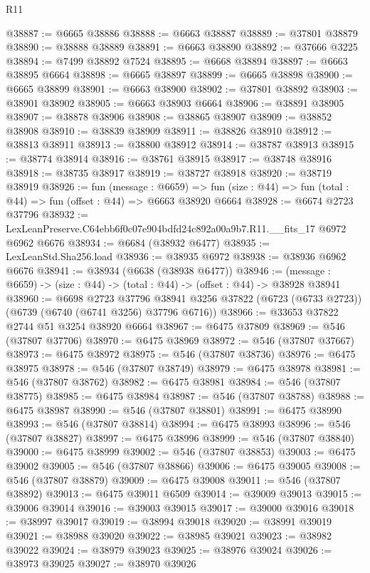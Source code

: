\begin{lexlean}{R11}
\begin{coremodule}
@38887 := @6665 @38886
@38888 := @6663 @38887
@38889 := @37801 @38879
@38890 := @38888 @38889
@38891 := @6663 @38890
@38892 := @37666 @3225
@38894 := @7499 @38892 @7524
@38895 := @6668 @38894
@38897 := @6663 @38895 @6664
@38898 := @6665 @38897
@38899 := @6665 @38898
@38900 := @6665 @38899
@38901 := @6663 @38900
@38902 := @37801 @38892
@38903 := @38901 @38902
@38905 := @6663 @38903 @6664
@38906 := @38891 @38905
@38907 := @38878 @38906
@38908 := @38865 @38907
@38909 := @38852 @38908
@38910 := @38839 @38909
@38911 := @38826 @38910
@38912 := @38813 @38911
@38913 := @38800 @38912
@38914 := @38787 @38913
@38915 := @38774 @38914
@38916 := @38761 @38915
@38917 := @38748 @38916
@38918 := @38735 @38917
@38919 := @38727 @38918
@38920 := @38719 @38919
@38926 := fun (message : @6659) =>
  fun (size : @44) => fun (total : @44) => fun (offset : @44) => @6663 @38920 @6664
@38928 := @6674 @2723 @37796
@38932 := LexLeanPreserve.C64ebb6f0c07e904bdfd24c892a00a9b7.R11.__fits_17 @6972 @6962 @6676
@38934 := @6684 (@38932 @6477)
@38935 := LexLeanStd.Sha256.load
@38936 := @38935 @6972
@38938 := @38936 @6962 @6676
@38941 := @38934 (@6638 (@38938 @6477))
@38946 := (message : @6659) -> (size : @44) -> (total : @44) -> (offset : @44) -> @38928 @38941
@38960 := @6698
    @2723
    @37796
    @38941
    @3256
    @37822
    (@6723 (@6733 @2723))
    (@6739 (@6740 (@6741 @3256) @37796 @6716))
@38966 := @33653 @37822 @2744 @51 @3254 @38920 @6664
@38967 := @6475 @37809
@38969 := @546 (@37807 @37706)
@38970 := @6475 @38969
@38972 := @546 (@37807 @37667)
@38973 := @6475 @38972
@38975 := @546 (@37807 @38736)
@38976 := @6475 @38975
@38978 := @546 (@37807 @38749)
@38979 := @6475 @38978
@38981 := @546 (@37807 @38762)
@38982 := @6475 @38981
@38984 := @546 (@37807 @38775)
@38985 := @6475 @38984
@38987 := @546 (@37807 @38788)
@38988 := @6475 @38987
@38990 := @546 (@37807 @38801)
@38991 := @6475 @38990
@38993 := @546 (@37807 @38814)
@38994 := @6475 @38993
@38996 := @546 (@37807 @38827)
@38997 := @6475 @38996
@38999 := @546 (@37807 @38840)
@39000 := @6475 @38999
@39002 := @546 (@37807 @38853)
@39003 := @6475 @39002
@39005 := @546 (@37807 @38866)
@39006 := @6475 @39005
@39008 := @546 (@37807 @38879)
@39009 := @6475 @39008
@39011 := @546 (@37807 @38892)
@39013 := @6475 @39011 @6509
@39014 := @39009 @39013
@39015 := @39006 @39014
@39016 := @39003 @39015
@39017 := @39000 @39016
@39018 := @38997 @39017
@39019 := @38994 @39018
@39020 := @38991 @39019
@39021 := @38988 @39020
@39022 := @38985 @39021
@39023 := @38982 @39022
@39024 := @38979 @39023
@39025 := @38976 @39024
@39026 := @38973 @39025
@39027 := @38970 @39026

\end{coremodule}
\end{lexlean}
